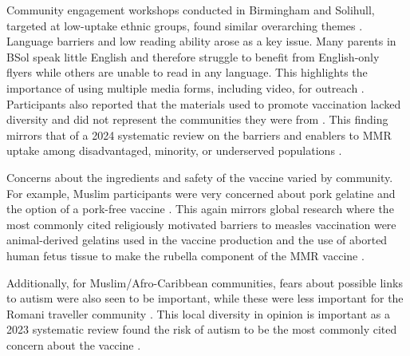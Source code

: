 \documentclass{article}
\begin{document}
Community engagement workshops conducted in Birmingham and Solihull, targeted at low-uptake ethnic groups, found similar overarching themes \cite{bissett_measles_soft_intelligence_2024, palmer_birmingham_measles_engagement_2024, smbc_community_engagement_learning_2025}. Language barriers and low reading ability arose as a key issue. Many parents in BSol speak little English and therefore struggle to benefit from English-only flyers while others are unable to read in any language. This highlights the importance of using multiple media forms, including video, for outreach \cite{palmer_birmingham_measles_engagement_2024, smbc_community_engagement_learning_2025}. Participants also reported that the materials used to promote vaccination lacked diversity and did not represent the communities they were from \cite{palmer_birmingham_measles_engagement_2024}. This finding mirrors that of a 2024 systematic review on the barriers and enablers to MMR uptake among disadvantaged, minority, or underserved populations \cite{essa2024understanding}.

Concerns about the ingredients and safety of the vaccine varied by community. For example, Muslim participants were very concerned about pork gelatine and the option of a pork-free vaccine \cite{palmer_birmingham_measles_engagement_2024, smbc_community_engagement_learning_2025}. This again mirrors global research where the most commonly cited religiously motivated barriers to measles vaccination were animal-derived gelatins used in the vaccine production and the use of aborted human fetus tissue to make the rubella component of the MMR vaccine \cite{wombwell2015religious}.

Additionally, for Muslim/Afro-Caribbean communities, fears about possible links to autism were also seen to be important, while these were less important for the Romani traveller community \cite{palmer_birmingham_measles_engagement_2024, smbc_community_engagement_learning_2025}. This local diversity in opinion is important as a 2023 systematic review found the risk of autism to be the most commonly cited concern about the vaccine \cite{novilla2023parents}.
\end{document}
